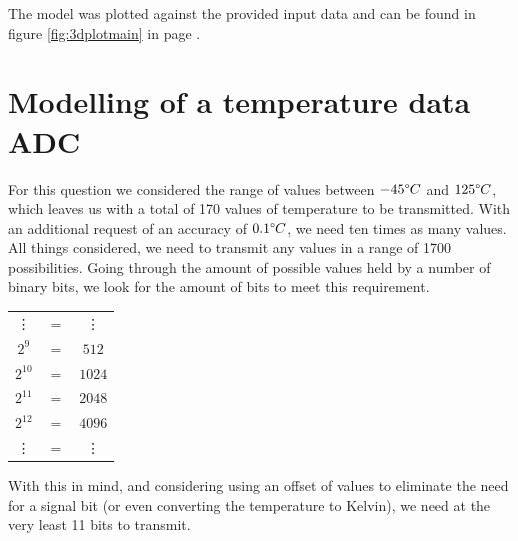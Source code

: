 \documentclass[english,palatino]{ist-report}
\begin{document}
The model was plotted against the provided input data and can be found in figure \ref{fig:3dplotmain} in page \pageref{fig:3dplotmain}.
%

\section{Modelling of a temperature data ADC}
For this question we considered the range of values between $\num{-45}\degree C$ and $\num{125}\degree C$, which leaves us with a total of 170 values of temperature to be transmitted. With an additional request of an accuracy of $\num{0.1}\degree C$, we need ten times as many values. All things considered, we need to transmit any values in a range of 1700 possibilities. Going through the amount of possible values held by a number of binary bits, we look for the amount of bits to meet this requirement.

\begin{table}[ht]
	\centering
	\begin{tabular}{ccc}
		\vdots		& $=$	& \vdots	\\
		$2^9$		& $=$	& $512$		\\
		$2^{10}$	& $=$	& $1024$	\\
		$2^{11}$	& $=$	& $2048$	\\
		$2^{12}$	& $=$	& $4096$	\\
		\vdots		& $=$	& \vdots	\\
	\end{tabular}
\end{table}

With this in mind, and considering using an offset of values to eliminate the need for a signal bit (or even converting the temperature to Kelvin), we need at the very least 11 bits to transmit.
\end{document}
